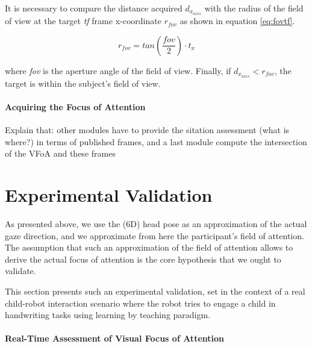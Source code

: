\documentclass{sig-alternate}
\begin{document}
It is necessary to compare the distance acquired $ d_{x_{axis}} $ with the
radius of the field of view at the target \textit{tf} frame x-coordinate $
r_{fov} $ as shown in equation \ref{eq:fovtf}.

\begin{equation}
r_{fov} = tan\left(\frac{fov}{2}\right) \cdot t_x
\label{eq:fovtf}
\end{equation}

where \textit{fov} is the aperture angle of the field of view. Finally, if $
d_{x_{axis}}<r_{fov} $, the target is within the subject's field of view.


\paragraph{Acquiring the Focus of Attention}

Explain that: other modules have to provide the sitation assessment (what
is where?) in terms of published frames, and a last module compute the
intersection of the VFoA and these frames




\section{Experimental Validation}

As presented above, we use the (6D) head pose as an approximation of the
actual gaze direction, and we approximate from here the participant's field of
attention. The assumption that such an approximation of the field of attention
allows to derive the actual focus of attention is the core hypothesis that we
ought to validate.

This section presents such an experimental validation, set in the context of a
real child-robot interaction scenario where the robot tries to engage a child in
handwriting tasks using learning by teaching paradigm.

\paragraph{Real-Time Assessment of Visual Focus of Attention}
\end{document}
